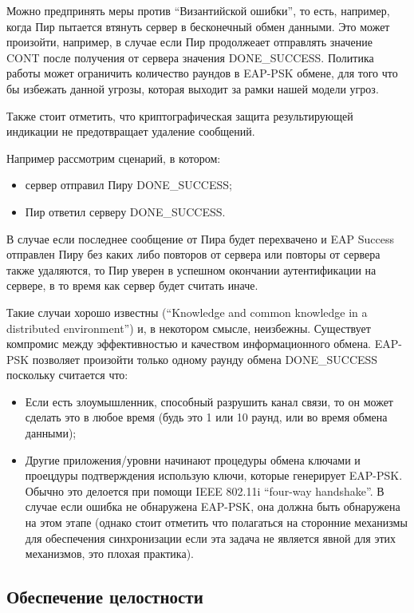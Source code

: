 Можно предпринять меры против ``Византийской ошибки'', то есть, например, когда Пир пытается втянуть сервер в бесконечный обмен данными. Это может произойти, например, в случае если Пир продолжеает отправлять значение CONT после получения от сервера значения DONE\_SUCCESS. Политика работы может ограничить количество раундов в EAP-PSK обмене, для того что бы избежать данной угрозы, которая выходит за рамки нашей модели угроз.

Также стоит отметить, что криптографическая защита результирующей индикации не предотвращает удаление сообщений.

Например рассмотрим сценарий, в котором:
\begin{itemize}
\item сервер отправил Пиру DONE\_SUCCESS;
\item Пир ответил серверу DONE\_SUCCESS.
\end{itemize}

В случае если последнее сообщение от Пира будет перехвачено и EAP Success отправлен Пиру без каких либо повторов от сервера или повторы от сервера также удаляются, то Пир уверен в успешном окончании аутентификации на сервере, в то время как сервер будет считать иначе.

Такие случаи хорошо известны (``Knowledge and common knowledge in a distributed environment'') и, в некотором смысле, неизбежны. Существует компромис между эффективностью и качеством информационного обмена. EAP-PSK позволяет произойти только одному раунду обмена DONE\_SUCCESS поскольку считается что:

\begin{itemize}
\item Если есть злоумышленник, способный разрушить канал связи, то он может сделать это в любое время (будь это 1 или 10 раунд, или во время обмена данными);
\item Другие приложения/уровни начинают процедуры обмена ключами и проецдуры подтверждения использую ключи, которые генерирует EAP-PSK. Обычно это делоется при помощи IEEE 802.11i ``four-way handshake''. В случае если ошибка не обнаружена EAP-PSK, она должна быть обнаружена на этом этапе (однако стоит отметить что полагаться на сторонние механизмы для обеспечения синхронизации если эта задача не является явной для этих механизмов, это плохая практика).
\end{itemize}

\subsection{Обеспечение целостности}

